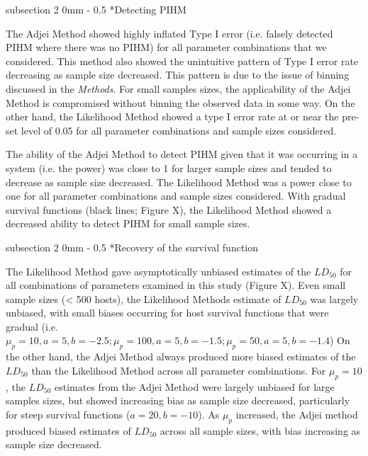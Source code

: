 \documentclass[12pt, a4paper]{article}
\makeatletter
\renewcommand{\subsection}{\@startsection
{subsection}%
{2}%
{0mm}%
{-\baselineskip}%
{0.5\baselineskip}%
{\normalfont\bf}} %
\makeatother
\begin{document}
\subsection*{Detecting PIHM}

The Adjei Method showed highly inflated Type I error (i.e. falsely detected
PIHM where there was no PIHM) for all parameter combinations that we
considered.  This method also showed the unintuitive pattern of Type I error
rate decreasing as sample size decreased.  This pattern is due to the issue of
binning discussed in the \emph{Methods}. For small samples sizes, the
applicability of the Adjei Method is compromised without binning the observed
data in some way.  On the other hand, the Likelihood Method showed a type I
error rate at or near the pre-set level of 0.05 for all parameter combinations
and sample sizes considered.

The ability of the Adjei Method to detect PIHM given that it was occurring in a
system (i.e. the power) was close to 1 for larger sample sizes and tended to
decrease as sample size decreased.  The Likelihood Method was a power close to
one for all parameter combinations and sample sizes considered.  With gradual
survival functions (black lines; Figure X), the Likelihood Method showed a
decreased ability to detect PIHM for small sample sizes.

\subsection*{Recovery of the survival function}

The Likelihood Method gave asymptotically unbiased estimates of the $LD_{50}$
for all combinations of parameters examined in this study (Figure X).  Even
small sample sizes (< 500 hosts), the Likelihood Methods estimate of $LD_{50}$
was largely unbiased, with small biases occurring for host survival functions
that were gradual (i.e. $\mu_p = 10, a = 5, b = -2.5; \mu_p = 100, a = 5, b=
-1.5; \mu_p = 50, a = 5, b = -1.4$)   On the other hand, the Adjei Method
always produced more biased estimates of the $LD_{50}$ than the Likelihood
Method across all parameter combinations.  For $\mu_p = 10$, the $LD_{50}$
estimates from the Adjei Method were largely unbiased for large samples sizes,
but showed increasing bias as sample size decreased, particularly for steep
survival functions ($a = 20, b = -10$).  As $\mu_p$ increased, the Adjei method
produced biased estimates of $LD_{50}$ across all sample sizes, with bias
increasing as sample size decreased.
\end{document}
